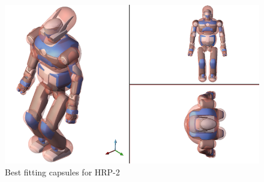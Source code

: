 \begin{figure}
  \centering
  \includegraphics[width=0.9\linewidth]
                  {src/chap3-optimal-motion-planning/figure/hrp2-capsule-transparent.png}
  \caption{Best fitting capsules for HRP-2}
  \label{hrp2-capsule}
\end{figure}


